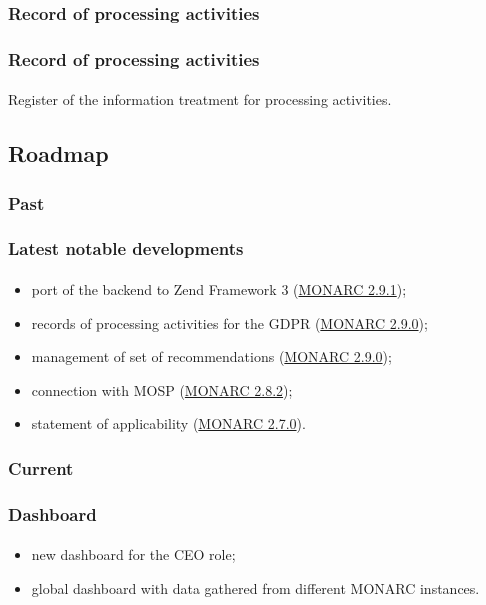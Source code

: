 \subsubsection{Record of processing activities}
\begin{frame}
    \frametitle{Record of processing activities}
    \framesubtitle{}
    Register of the information treatment for processing activities.
\end{frame}



\subsection{Roadmap}
\subsubsection{Past}
\begin{frame}
    \frametitle{Latest notable developments}
    \framesubtitle{}
    \begin{itemize}
        \item port of the backend to Zend Framework 3 (\href{https://www.monarc.lu/news/2019/11/25/monarc-291-released/}{MONARC 2.9.1});
        \item records of processing activities for the GDPR (\href{https://www.monarc.lu/news/2019/08/23/monarc-290-released/}{MONARC 2.9.0});
        \item management of set of recommendations (\href{https://www.monarc.lu/news/2019/08/23/monarc-290-released/}{MONARC 2.9.0});
        \item connection with MOSP (\href{https://www.monarc.lu/news/2019/05/28/monarc-282-released/}{MONARC 2.8.2});
        \item statement of applicability (\href{https://www.monarc.lu/news/2018/08/22/monarc-270-released/}{MONARC 2.7.0}).
    \end{itemize}
\end{frame}

\subsubsection{Current}
\begin{frame}
    \frametitle{Dashboard}
    \framesubtitle{}
    \begin{itemize}
        \item new dashboard for the CEO role;
        \item global dashboard with data gathered from different MONARC instances.
    \end{itemize}
\end{frame}

